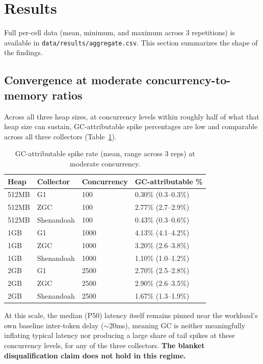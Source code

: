 \documentclass[11pt]{article}
\newcommand{\code}[1]{\texttt{#1}}
\begin{document}
\section{Results}

Full per-cell data (mean, minimum, and maximum across 3 repetitions) is available in
\code{data/results/aggregate.csv}. This section summarizes the shape of the findings.

\subsection{Convergence at moderate concurrency-to-memory ratios}

Across all three heap sizes, at concurrency levels within roughly half of what that heap size
can sustain, GC-attributable spike percentages are low and comparable across all three
collectors (Table~\ref{tab:convergence}).

\begin{table}[h]
\centering
\caption{GC-attributable spike rate (mean, range across 3 reps) at moderate concurrency.}
\label{tab:convergence}
\begin{tabular}{llll}
\toprule
Heap & Collector & Concurrency & GC-attributable \% \\
\midrule
512MB & G1 & 100 & 0.30\% (0.3--0.3\%) \\
512MB & ZGC & 100 & 2.77\% (2.7--2.9\%) \\
512MB & Shenandoah & 100 & 0.43\% (0.3--0.6\%) \\
1GB & G1 & 1000 & 4.13\% (4.1--4.2\%) \\
1GB & ZGC & 1000 & 3.20\% (2.6--3.8\%) \\
1GB & Shenandoah & 1000 & 1.10\% (1.0--1.2\%) \\
2GB & G1 & 2500 & 2.70\% (2.5--2.8\%) \\
2GB & ZGC & 2500 & 2.90\% (2.6--3.5\%) \\
2GB & Shenandoah & 2500 & 1.67\% (1.3--1.9\%) \\
\bottomrule
\end{tabular}
\end{table}

At this scale, the median (P50) latency itself remains pinned near the workload's own baseline
inter-token delay ($\sim$20ms), meaning GC is neither meaningfully inflating typical latency nor
producing a large share of tail spikes at these concurrency levels, for any of the three
collectors. \textbf{The blanket disqualification claim does not hold in this regime.}
\end{document}
